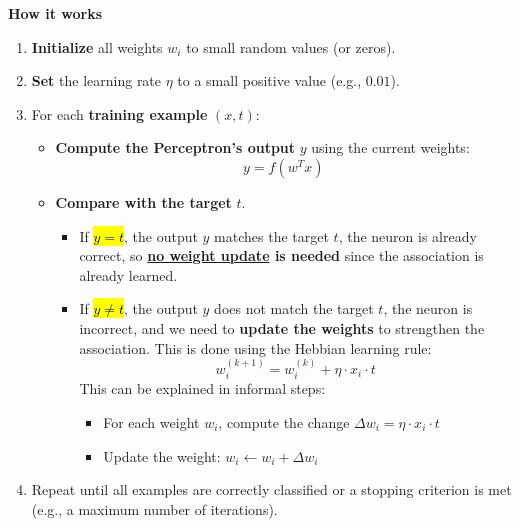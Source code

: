 \highspace
\begin{flushleft}
    \textcolor{Green3}{ \textbf{How it works}}
\end{flushleft}
\begin{enumerate}
    \item \textbf{Initialize} all weights $w_i$ to small random values (or zeros).
    \item \textbf{Set} the learning rate $\eta$ to a small positive value (e.g., $0.01$).
    \item For each \textbf{training example} $\left(x, t\right)$:
        \begin{itemize}
            \item \textbf{Compute the Perceptron's output} $y$ using the current weights:
                \begin{equation*}
                    y = f\left(w^{T} x\right)
                \end{equation*}
            \item \textbf{Compare with the target} $t$.
                \begin{itemize}
                    \item[\textcolor{Green3}{\faIcon{check-circle}}] If \hl{$y = t$}, the output $y$ matches the target $t$, the neuron is already correct, so \textbf{\underline{no weight update} is needed} since the association is already learned.
                    \item[\textcolor{Red2}{\faIcon{times-circle}}] If \hl{$y \neq t$}, the output $y$ does not match the target $t$, the neuron is incorrect, and we need to \textbf{update the weights} to strengthen the association. This is done using the Hebbian learning rule:
                        \begin{equation*}
                            w_{i}^{(k+1)} = w_{i}^{(k)} + \eta \cdot x_{i} \cdot t
                        \end{equation*}
                        This can be explained in informal steps:
                        \begin{itemize}
                            \item For each weight $w_i$, compute the change $\Delta w_i = \eta \cdot x_i \cdot t$
                            \item Update the weight: $w_i \leftarrow w_i + \Delta w_i$
                        \end{itemize}
                \end{itemize}
        \end{itemize}
    \item Repeat until all examples are correctly classified or a stopping criterion is met (e.g., a maximum number of iterations).
\end{enumerate}

